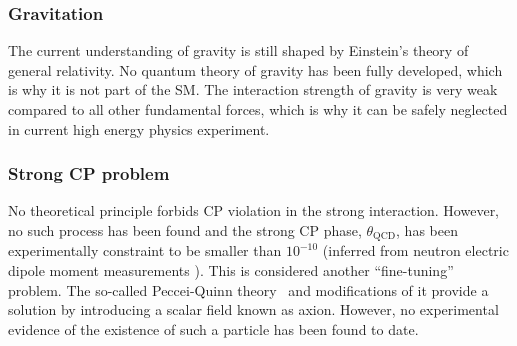 
\subsubsection{Gravitation}
The current understanding of gravity is still shaped by Einstein's theory of general relativity. No quantum theory of gravity has been fully developed, which is why it is not part of the SM. 
The interaction strength of gravity is very weak compared to all other fundamental forces, which is why it can be safely neglected in current high energy physics experiment.

\subsubsection{Strong CP problem}
No theoretical principle forbids CP violation in the strong interaction. However, no such process has been found and the strong CP phase, $\theta_{\text{QCD}}$, has been experimentally constraint to be smaller than $10^{-10}$ (inferred from neutron electric dipole moment measurements \cite{Baker_2006}). This is considered another ``fine-tuning'' problem.
The so-called Peccei-Quinn theory~\cite{PhysRevLett.38.1440} and modifications of it provide a solution by introducing a scalar field known as axion. However, no experimental evidence of the existence of such a particle has been found to date.





